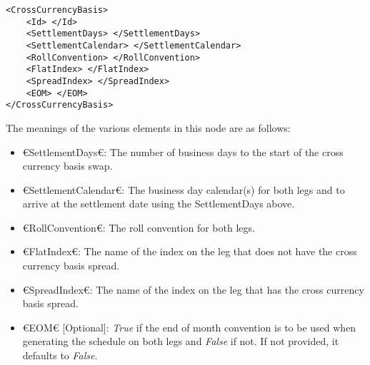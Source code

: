 \begin{lstlisting}[caption={Cross currency basis swap conventions}, label=lst:xccy_basis_conventions]
<CrossCurrencyBasis>
	<Id> </Id>
	<SettlementDays> </SettlementDays>
	<SettlementCalendar> </SettlementCalendar>
	<RollConvention> </RollConvention>
	<FlatIndex> </FlatIndex>
	<SpreadIndex> </SpreadIndex>
	<EOM> </EOM>
</CrossCurrencyBasis>
\end{lstlisting}

The meanings of the various elements in this node are as follows:
\begin{itemize}
\item €SettlementDays€: The number of business days to the start of the cross currency basis swap.
\item €SettlementCalendar€: The business day calendar(s) for both legs and to arrive at the settlement date using the 
SettlementDays above.
\item €RollConvention€: The roll convention for both legs.
\item €FlatIndex€: The name of the index on the leg that does not have the cross currency basis spread.
\item €SpreadIndex€: The name of the index on the leg that has the cross currency basis spread.
\item €EOM€ [Optional]: \emph{True} if the end of month convention is to be used when generating the schedule on both legs 
and \emph{False} if not. If not provided, it defaults to \emph{False}.
\end{itemize}
